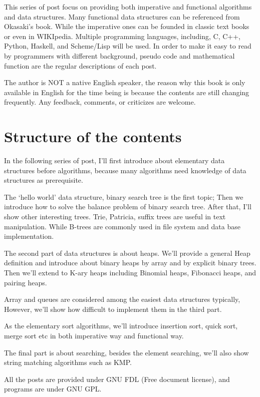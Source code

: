 \documentclass[UTF8]{article}
\begin{document}
This series of post focus on providing both imperative and functional
algorithms and data structures. Many functional data structures
can be referenced from Okasaki's book\cite{okasaki-book}. While
the imperative ones can be founded in classic text books \cite{CLRS}
or even in WIKIpedia.
Multiple
programming languages, including, C, C++, Python, Haskell, and
Scheme/Lisp will be used. In order to make it easy to read
by programmers with different background, pseudo code and mathematical
function are the regular descriptions of each post.

The author is NOT a native English speaker, the reason why
this book is only available in English for the time being
is because the contents are still changing frequently. Any
feedback, comments, or criticizes are welcome.

\section{Structure of the contents}
In the following series of post, I'll first introduce about
elementary data structures before algorithms, because many
algorithms need knowledge of data structures as prerequisite.

The `hello world' data structure, binary search tree is the
first topic; Then we introduce how to solve the balance problem
of binary search tree. After that, I'll show other interesting
trees. Trie, Patricia, suffix trees are useful in text manipulation.
While B-trees are commonly used in file system and data base
implementation.

The second part of data structures is about heaps. We'll
provide a general Heap definition and introduce about binary
heaps by array and by explicit binary trees. Then we'll
extend to K-ary heaps including Binomial heaps, Fibonacci
heaps, and pairing heaps.

Array and queues are considered among the easiest data structures
typically, However, we'll show how difficult to implement
them in the third part.

As the elementary sort algorithms, we'll introduce insertion
sort, quick sort, merge sort etc in both imperative way
and functional way.

The final part is about searching, besides the element
searching, we'll also show string matching algorithms
such as KMP.

All the posts are provided under GNU FDL (Free document
license), and programs are under GNU GPL.
\end{document}
